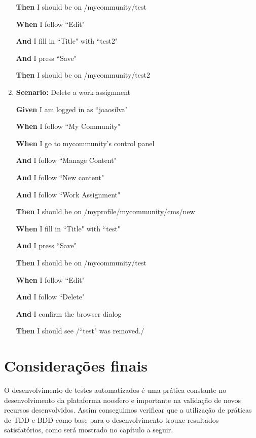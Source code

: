 \begin{enumerate}
    \textbf{Then} I should be on /mycommunity/test
    
    \textbf{When} I follow ``Edit"
    
    \textbf{And} I fill in ``Title" with ``test2"
    
    \textbf{And} I press ``Save"
    
    \textbf{Then} I should be on /mycommunity/test2

\item \textbf{Scenario:} Delete a work assignment  
   
    \textbf{Given} I am logged in as ``joaosilva"
   
    \textbf{When} I follow ``My Community"
   
    \textbf{When} I go to mycommunity's control panel
   
    \textbf{And} I follow ``Manage Content"
   
    \textbf{And} I follow ``New content"
   
    \textbf{And} I follow ``Work Assignment"
   
    \textbf{Then} I should be on /myprofile/mycommunity/cms/new
   
    \textbf{When} I fill in ``Title" with ``test"
   
    \textbf{And} I press ``Save"
   
    \textbf{Then} I should be on /mycommunity/test
   
    \textbf{When} I follow ``Edit"
   
    \textbf{And} I follow ``Delete"
   
    \textbf{And} I confirm the browser dialog
   
    \textbf{Then} I should see /``test" was removed./
    
\end{enumerate}

\section{Considerações finais}

O desenvolvimento de testes automatizados é uma prática constante no desenvolvimento da plataforma noosfero e importante na validação de novos recursos desenvolvidos. Assim conseguimos verificar que a utilização de práticas de TDD e BDD como base para o desenvolvimento trouxe resultados satisfatórios, como será mostrado no capítulo a seguir.
